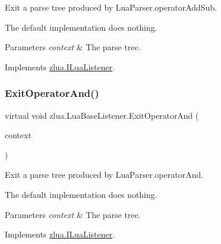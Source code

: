 Exit a parse tree produced by Lua\+Parser.\+operator\+Add\+Sub. 

The default implementation does nothing.


\begin{DoxyParams}{Parameters}
{\em context} & The parse tree.\\
\hline
\end{DoxyParams}


Implements \mbox{\hyperlink{interfacezlua_1_1_i_lua_listener_a3d98f03e4ef336437a07903ea76df622}{zlua.\+I\+Lua\+Listener}}.

\mbox{\label{classzlua_1_1_lua_base_listener_ad0372c70a4c0b53a69f958e1d8c16065}} 
\subsubsection{\texorpdfstring{Exit\+Operator\+And()}{ExitOperatorAnd()}}
{\footnotesize\ttfamily virtual void zlua.\+Lua\+Base\+Listener.\+Exit\+Operator\+And (\begin{DoxyParamCaption}\item[{\mbox{[}\+Not\+Null\mbox{]} \mbox{\hyperlink{classzlua_1_1_lua_parser_1_1_operator_and_context}{Lua\+Parser.\+Operator\+And\+Context}}}]{context }\end{DoxyParamCaption})\hspace{0.3cm}{\ttfamily [virtual]}}



Exit a parse tree produced by Lua\+Parser.\+operator\+And. 

The default implementation does nothing.


\begin{DoxyParams}{Parameters}
{\em context} & The parse tree.\\
\hline
\end{DoxyParams}


Implements \mbox{\hyperlink{interfacezlua_1_1_i_lua_listener_a5b2a0ab0a1e41daa744680bd657adfa8}{zlua.\+I\+Lua\+Listener}}.

\mbox{\label{classzlua_1_1_lua_base_listener_ac5e1c31e302e8eeae5a2bb9c585b40a2}} 
